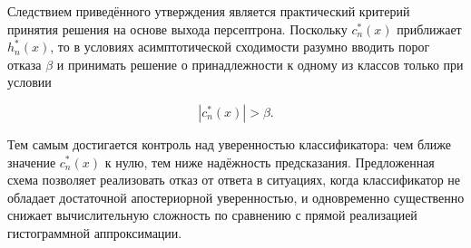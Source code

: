 Следствием приведённого утверждения является практический критерий принятия решения на основе выхода персептрона. Поскольку \(c_n^*(x)\) приближает \(h_n^*(x)\), то в условиях асимптотической сходимости разумно вводить порог отказа \(\beta\) и принимать решение о принадлежности к одному из классов только при условии

\[
|c_n^*(x)| > \beta.
\]

Тем самым достигается контроль над уверенностью классификатора: чем ближе значение \(c_n^*(x)\) к нулю, тем ниже надёжность предсказания. Предложенная схема позволяет реализовать отказ от ответа в ситуациях, когда классификатор не обладает достаточной апостериорной уверенностью, и одновременно существенно снижает вычислительную сложность по сравнению с прямой реализацией гистограммной аппроксимации.
